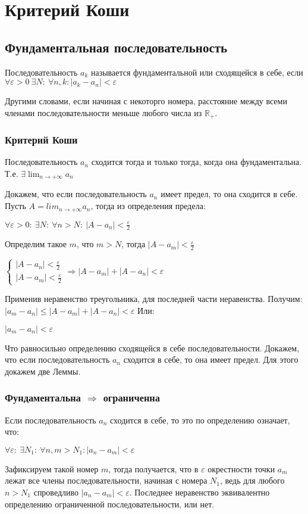 \section{Критерий Коши}
\subsection{Фундаментальная последовательность}
\begin{mydef}
Последовательность $a_k$ называется фундаментальной или сходящейся в себе, если $\forall \varepsilon > 0 \ \exists N: \ \forall n,k: |a_k - a_n| < \varepsilon$
\end{mydef}
Другими словами, если начиная с некоторго номера, расстояние между всеми членами последовательности меньше любого числа из $\mathbb{R}_+$.
\subsubsection{Критерий Коши}
\begin{mydef}
Последовательность $a_n$ сходится тогда и только тогда, когда она фундаментальна. Т.е. $\displaystyle \exists \lim_{n \to +\infty} a_n$
\end{mydef}
Докажем, что если последовательность $a_n$ имеет предел, то она сходится в себе. Пусть $\displaystyle A=lim_{n \to +\infty}a_n$, тогда из определения предела:
\begin{center}$\forall \varepsilon > 0: \ \exists N : \ \forall n > N: \ |A - a_n| < \frac{\varepsilon}{2}$\end{center}
Определим такое $m$, что $m > N$, тогда $|A - a_m| < \frac{\varepsilon}{2}$
\begin{center}$\begin{cases}
|A - a_n| < \frac{\varepsilon}{2} \\
|A - a_m| < \frac{\varepsilon}{2}
\end{cases} \Longrightarrow  |A - a_m| + |A - a_n| < \varepsilon$
\end{center}
Применив неравенство треугольника, для последней части неравенства. Получим:
$|a_m - a_n| \leq |A - a_m| + |A - a_n| < \varepsilon$ 
Или:
\begin{center}$|a_m - a_n| < \varepsilon$ \end{center}
Что равносильно определению сходящейся в себе последовательности. \newline\newline
Докажем, что если последовательность $a_n$ сходится в себе, то она имеет предел. Для этого докажем две Леммы.
\subsubsection{Фундаментальна $\Rightarrow$ ограниченна}
Если последовательность $a_n$ сходится в себе, то это по определению означает, что:
\begin{center}$\forall \varepsilon: \ \exists N_1: \ \forall n, m > N_1: |a_n - a_m| < \varepsilon $\end{center}
Зафиксируем такой номер $m$, тогда получается, что в $\varepsilon$ окрестности точки $a_m$ лежат все члены последовательности, начиная с номера $N_1$, ведь для любого $n > N_1$ спроведливо $|a_n - a_m| < \varepsilon$. Последнее неравенство эквивалентно определению ограниченной последовательности, или нет.

